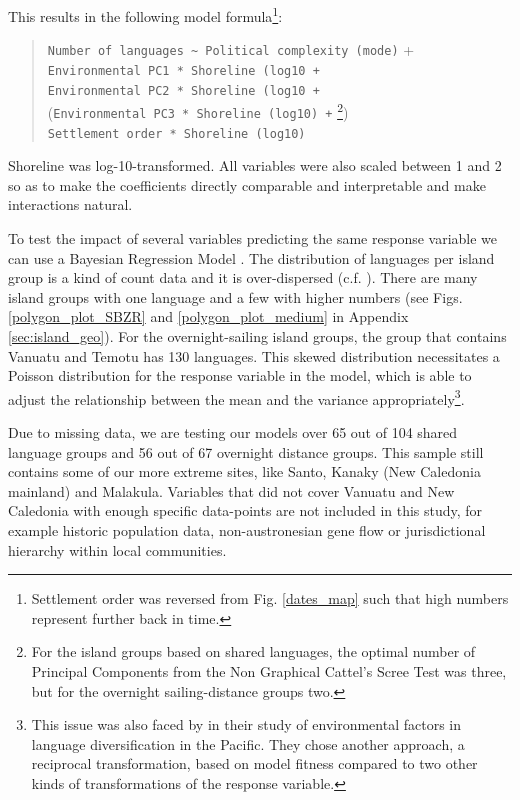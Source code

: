 \documentclass[a4paper,10pt]{article} %
\begin{document}
This results in the following model formula\footnote{Settlement order was reversed from Fig. \ref{dates_map} such that high numbers represent further back in time.}:

\begin{quotation}

\texttt{Number of languages \textasciitilde{} Political complexity (mode)} + \\
\indent \indent \texttt{Environmental PC1  *  Shoreline (log10 +} \\
\indent \indent\texttt{Environmental PC2  *  Shoreline (log10 +} \\
\indent \indent (\texttt{Environmental PC3 *  Shoreline (log10) +} \footnote{For the island groups based on shared languages, the optimal number of Principal Components from the Non Graphical Cattel's Scree Test was three, but for the overnight sailing-distance groups two.})\\
\indent \indent\texttt{Settlement order *  Shoreline (log10)} \\

\end{quotation}

Shoreline was log-10-transformed. All variables were also scaled between 1 and 2 so as to make the coefficients directly comparable and interpretable and make interactions natural.

To test the impact of several variables predicting the same response variable we can use a Bayesian Regression Model  \citep{burkner2017brms}. The distribution of languages per island group is a kind of count data and it is over-dispersed (c.f. \citet[4-5]{gavin2012island}). There are many island groups with one language and a few with higher numbers (see Figs. \ref{polygon_plot_SBZR} and \ref{polygon_plot_medium} in Appendix \ref{sec:island_geo}). For the overnight-sailing island groups, the group that contains Vanuatu and Temotu has 130 languages. This skewed distribution necessitates a Poisson distribution for the response variable in the model, which is able to adjust the relationship between the mean and the variance appropriately\footnote{This issue was also faced by \citet{gavin2012island} in their study of environmental factors in language diversification in the Pacific. They chose another approach, a reciprocal transformation, based on model fitness compared to two other kinds of transformations of the response variable.}.

Due to missing data, we are testing our models over 65 out of 104 shared language groups and 56 out of 67 overnight distance groups. This sample still contains some of our more extreme sites, like Santo, Kanaky (New Caledonia mainland) and Malakula. Variables that did not cover Vanuatu and New Caledonia with enough specific data-points are not included in this study, for example historic population data, non-austronesian gene flow or jurisdictional hierarchy within local communities. 
\end{document}
